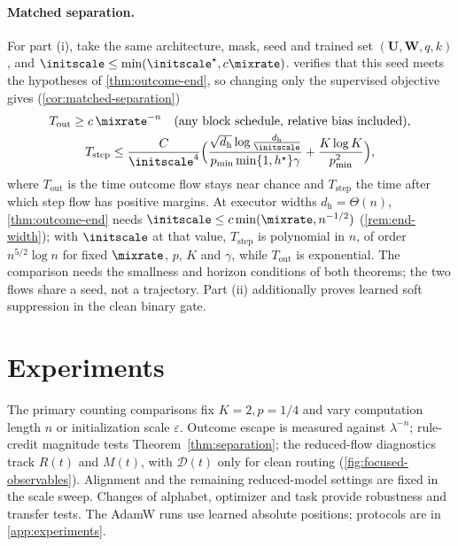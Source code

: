 \paragraph{Matched separation.} For part (i), take the same architecture, mask, seed and trained set $(\mathbf U,\mathbf W,q,k)$, and $\initscale\le\min(\initscale^\star,c\mixrate)$.
 verifies that this seed meets the hypotheses of \cref{thm:outcome-end}, so changing only the supervised objective gives
(\cref{cor:matched-separation})
\begin{gather*}
 T_{\mathrm{out}}\ge c\,\mixrate^{-n}\quad\text{(any block schedule, relative bias included)},\\
 T_{\mathrm{step}}\le\frac{C}{\initscale^4}\Bigl(\frac{\sqrt{d_{\mathrm h}}\log\frac{d_{\mathrm h}}{\initscale}}{p_{\min}\min\{1,h^\star\}\gamma}+\frac{K\log K}{p_{\min}^2}\Bigr),
\end{gather*}
where $T_{\mathrm{out}}$ is the time outcome flow stays near chance and $T_{\mathrm{step}}$ the time after which step flow has positive margins. At executor
widths $d_{\mathrm h}=\Theta(n)$, \cref{thm:outcome-end} needs $\initscale\le c\min(\mixrate,n^{-1/2})$ (\cref{rem:end-width}); with $\initscale$ at that value, $T_{\mathrm{step}}$ is polynomial
in $n$, of order $n^{5/2}\log n$ for fixed $\mixrate$, $p$, $K$ and $\gamma$, while $T_{\mathrm{out}}$ is exponential. The comparison needs the smallness and horizon conditions of both theorems; the two flows share a seed, not a trajectory.
Part (ii) additionally proves learned soft suppression in the clean binary gate.

\suppressfloats[t]
\section{Experiments}
\label{sec:experiments}
\label{sec:validation}

The primary counting comparisons fix $K=2,p=1/4$ and vary computation length
$n$ or initialization scale $\varepsilon$. Outcome escape is measured against
$\lambda^{-n}$; rule-credit magnitude tests Theorem~\ref{thm:separation};
the reduced-flow diagnostics track $R(t)$ and $M(t)$, with $\mathcal D(t)$
only for clean routing (\cref{fig:focused-observables}). Alignment and the remaining
reduced-model settings are fixed in the scale sweep. Changes of alphabet,
optimizer and task provide robustness and transfer tests. The AdamW runs use
learned absolute positions; protocols are in \cref{app:experiments}.

